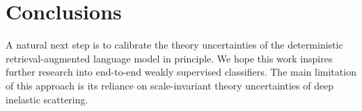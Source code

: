 \section{Conclusions}\label{sec:conclusions}

A natural next step is to calibrate the theory uncertainties of the
deterministic retrieval-augmented language model in principle. We hope
this work inspires further research into end-to-end weakly supervised
classifiers. The main limitation of this approach is its reliance on
scale-invariant theory uncertainties of deep inelastic scattering.

